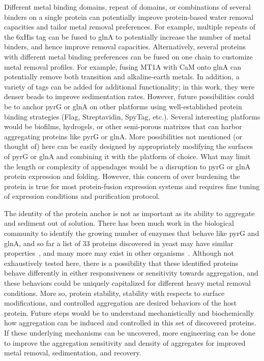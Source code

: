 \documentclass[../main/main]{subfiles}
\begin{document}
Different metal binding domains, repeat of domains, or combinations of several binders on a single protein can potentially improve protein-based water removal capacities and tailor metal removal preferences. For example, multiple repeats of the 6xHis tag can be fused to glnA to potentially increase the number of metal binders, and hence improve removal capacities. Alternatively, several proteins with different metal binding preferences can be fused on one chain to customize metal removal profiles. For example, fusing MT1A with CaM onto glnA can potentially remove both transition and alkaline-earth metals. In addition, a variety of tags can be added for additional functionality; in this work, they were denser beads to improve sedimentation rates. However, future possibilities could be to anchor pyrG or glnA on other platforms using well-established protein binding strategies (Flag, Streptavidin, SpyTag, etc.). Several interesting platforms would be biofilms, hydrogels, or other semi-porous matrixes that can harbor aggregating proteins like pyrG or glnA. More possibilities not mentioned (or thought of) here can be easily designed by appropriately modifying the surfaces of pyrG or glnA and combining it with the platform of choice. What may limit the length or complexity of appendages would be a disruption to pyrG or glnA protein expression and folding. However, this concern of over burdening the protein is true for most protein-fusion expression systems and requires fine tuning of expression conditions and purification protocol.

The identity of the protein anchor is not as important as its ability to aggregate and sediment out of solution. There has been much work in the biological community to identify the growing number of enzymes that behave like pyrG and glnA, and so far a list of 33 proteins discovered in yeast may have similar properties~\cite{narayanaswamy2009}, and many more may exist in other organisms~\cite{liu2010,carcamo2011}. Although not exhaustively tested here, there is a possibility that these identified proteins behave differently in either responsiveness or sensitivity towards aggregation, and these behaviors could be uniquely capitalized for different heavy metal removal conditions. More so, protein stability, stability with respects to surface modifications, and controlled aggregation are desired behaviors of the host protein. Future steps would be to understand mechanistically and biochemically how aggregation can be induced and controlled in this set of discovered proteins. If these underlying mechanisms can be uncovered, more engineering can be done to improve the aggregation sensitivity and density of aggregates for improved metal removal, sedimentation, and recovery.
\end{document}
